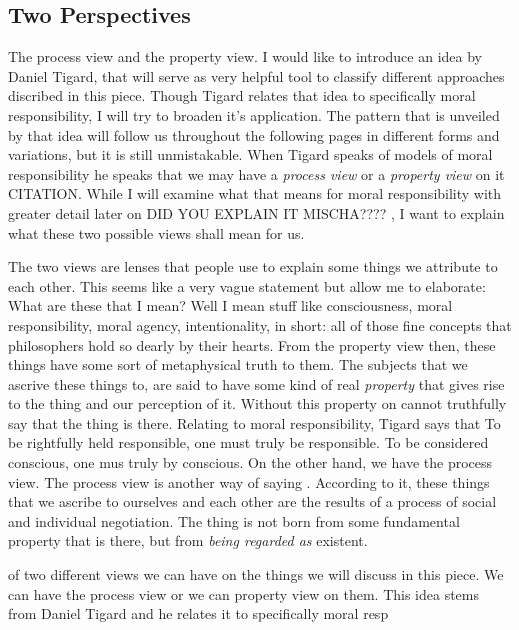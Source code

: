 \documentclass{article}
\begin{document}
\subsection{Two Perspectives}
The process view and the property view.
I would like to introduce an idea by Daniel Tigard, that will serve as very
helpful tool to classify different approaches discribed in this piece. Though
Tigard relates that idea to specifically moral responsibility, I will try to
broaden it's application. The pattern that is unveiled by that idea will follow
us throughout the following pages in different forms and variations, but it is
still unmistakable. When Tigard speaks of models of moral responsibility he
speaks that we may have a \textit{process view} or a \textit{property view} on
it CITATION. While I will examine what that means for moral responsibility with greater
detail later on
DID YOU EXPLAIN IT MISCHA????
, I want to explain what these two possible views shall mean for us.

The two views are lenses that people use to explain some things we attribute to
each other. This seems like a very vague statement but allow me to elaborate:
What are these  that I mean? Well I mean stuff like consciousness,
moral responsibility, moral agency, intentionality, in short: all of those fine
concepts that philosophers hold so dearly by their hearts. From the property
view then, these things have some sort of metaphysical truth to them. The
subjects that we ascrive these things to, are said to have some kind of real
\textit{property} that gives rise to the thing and our perception of it. Without
this property on cannot truthfully say that the thing is there. Relating to
moral responsibility, Tigard says that 
To be rightfully held responsible, one must truly be responsible. To be
considered conscious, one mus truly by conscious. On the other hand, we have the
process view. The process view is another way of saying . According to it, these things that we ascribe to ourselves and each
other are the results of a process of social and individual negotiation. The
thing is not born from some fundamental property that is there, but from
\textit{being regarded as} existent. 

of two different views we can have on the
things we will discuss in this piece.
We can have the process view or we can property view on them. This idea stems
from Daniel Tigard and he relates it to specifically moral resp
\end{document}
